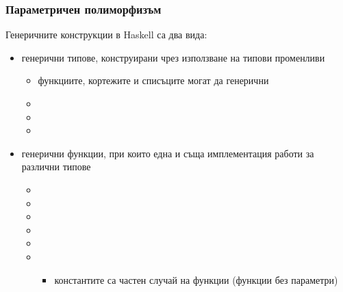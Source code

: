 \documentclass[alsotrans]{beamerswitch}
\begin{document}
\begin{frame}
  \frametitle{Параметричен полиморфизъм}

  Генеричните конструкции в Haskell са два вида:
  \begin{itemize}[<+->]
  \item \alert{генерични типове}, конструирани чрез използване на типови променливи
    \begin{itemize}
    \item функциите, кортежите и списъците могат да генерични
    \item {}
    \item {}
    \item {}
    \end{itemize}
  \item \alert{генерични функции}, при които една и съща имплементация работи за различни типове
    \begin{itemize}
    \item {}
    \item {}
    \item {}
    \item {}
    \item {}
    \item \lst{[] :: [a]}
      \begin{itemize}
      \item константите са частен случай на функции (функции без параметри)
      \end{itemize}
    \end{itemize}
  \end{itemize}
\end{frame}
\end{document}
